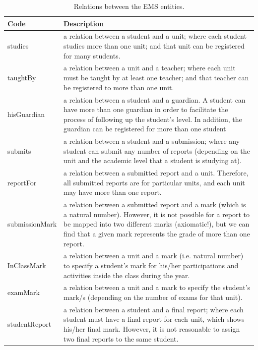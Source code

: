 \begin{table}[bth]
\centering
\caption{Relations between the EMS entities.}
\small
{}
\begin{tabular}{p{0.9 in} p{5.9 in}} \hline 
\hline
Code & Description\\\hline\hline

studies &   a relation between a student and a unit; where each student studies more than one unit; and that unit can be registered for many students. \\

taughtBy &  a relation between a unit and a teacher; where each unit must be taught by at least one teacher; and that teacher can be registered to more than one unit.\\

hisGuardian &  a relation between a student and a guardian.  A student can have more than one guardian in order to facilitate the process of following up the student's level.  In addition, the guardian can be registered for more than one student\\

submits &   a relation between a student and a submission; where any student can submit any number of reports (depending on the unit and the academic level that a student is studying at).\\

reportFor &  a relation between a submitted report and a unit.  Therefore, all submitted reports are for particular units, and each unit may have more than one report. \\

submissionMark &  a relation between a submitted report and a mark (which is a natural number).  However, it is not possible for a report to be mapped into two different marks (axiomatic!), but we can find that a given mark represents the grade of more than one report.\\

InClassMark &  a relation between a unit and a mark (i.e. natural number) to specify a student's mark for his/her participations and activities inside the class during the year. \\

examMark &  a relation between a unit and a mark to specify the student's mark/s (depending on the number of exams for that unit).\\ 

studentReport &  a relation between a student and a final report; where each student must have a final report for each unit, which shows his/her final mark.  However, it is not reasonable to assign two final reports to the same student.\\


\end{tabular}
\end{table}

